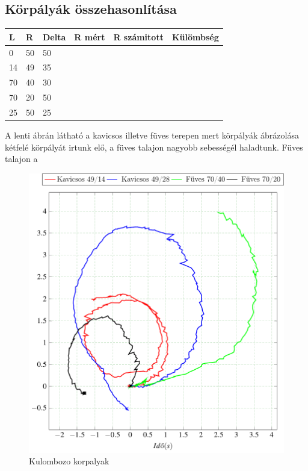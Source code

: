 



\subsection{Körpályák összehasonlítása}


\begin{table}[H]
\begin{tabular}{llllll}
\hline L & R & Delta & R mért & R számitott & Külömbség \\ \hline
 0 &  50 &    50   &        &             &           \\
 14 & 49 &    35   &        &             &           \\
 70 & 40 &    30   &        &             &           \\
 70 & 20 &    50   &        &             &           \\
 25 & 50 &    25   &        &             &          
\end{tabular}
\end{table}



A lenti ábrán látható a kavicsos illetve füves terepen mert körpályák ábrázolása kétfelé körpályát irtunk elő, a füves talajon nagyobb sebességél haladtunk. Füves talajon a 

\begin{figure}[H]
  \includegraphics{tikz/KorpalyakKavicsos.pdf}
  \caption{Kulombozo korpalyak}
  \label{fig:KorpalyakKavicsos}  
\end{figure}